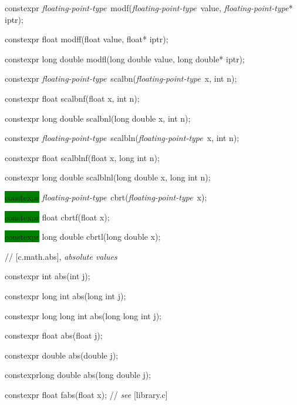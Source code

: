 \documentclass[prd,twocolumn,amsmath,amssymb,nofootinbib,eqsecnum]{revtex4-1}
\newcommand{\highlight}[1]{\colorbox{green}{\!\!\!\! #1}}
\newcommand{\oldhighlight}[1]{#1}
\newcommand{\stdcomment}[1]{{// {\it see} [#1]}}
\newcommand{\fptype}{{\it floating-point-type}}
\begin{document}
{\oldhighlight{constexpr} \fptype\ modf(\fptype\ value, \fptype* iptr);

\oldhighlight{constexpr}  float modff(float value, float* iptr);

\oldhighlight{constexpr}  long double modfl(long double value, long double* iptr);

\vspace{2ex}


\oldhighlight{constexpr} \fptype\ scalbn(\fptype\ x, int n);

\oldhighlight{constexpr} float scalbnf(float x, int n);

\oldhighlight{constexpr} long double scalbnl(long double x, int n);

\vspace{2ex}


\oldhighlight{constexpr} \fptype\ scalbln(\fptype\ x, int n);

\oldhighlight{constexpr} float scalblnf(float x, long int n);

\oldhighlight{constexpr} long double scalblnl(long double x, long int n);

\vspace{2ex}

\highlight{constexpr} \fptype\ cbrt(\fptype\ x);

\highlight{constexpr} float cbrtf(float x);

\highlight{constexpr} long double cbrtl(long double x);

\vspace{2ex}

//  [c.math.abs], {\it absolute values}


\oldhighlight{constexpr} int abs(int j);

\oldhighlight{constexpr} long int abs(long int j);

\oldhighlight{constexpr} long long int abs(long long int j);

\oldhighlight{constexpr} float abs(float j);

\oldhighlight{constexpr} double abs(double j);

\oldhighlight{constexpr}long double abs(long double j);

\vspace{2ex}


\oldhighlight{constexpr} float fabs(float x); \stdcomment{library.c}

}
\end{document}
